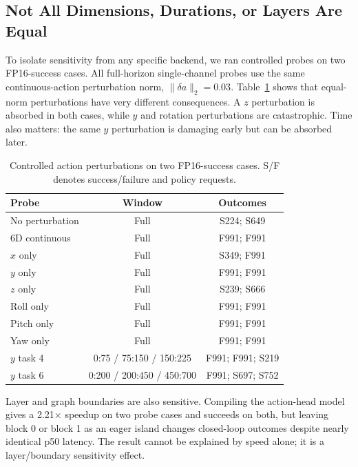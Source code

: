 \documentclass[letterpaper,10pt,twocolumn]{article}
\begin{document}
\subsection{Not All Dimensions, Durations, or Layers Are Equal}

To isolate sensitivity from any specific backend, we ran controlled probes on two FP16-success cases. All full-horizon single-channel probes use the same continuous-action perturbation norm, $\|\delta a\|_2=0.03$. Table~\ref{tab:icra-anisotropy} shows that equal-norm perturbations have very different consequences. A $z$ perturbation is absorbed in both cases, while $y$ and rotation perturbations are catastrophic. Time also matters: the same $y$ perturbation is damaging early but can be absorbed later.

\begin{table}[H]
\centering
\caption{Controlled action perturbations on two FP16-success cases. S/F denotes success/failure and policy requests.}
\label{tab:icra-anisotropy}
\scriptsize
\setlength{\tabcolsep}{2.5pt}
\begin{tabular}{lcc}
\toprule
Probe & Window & Outcomes \\
\midrule
No perturbation & Full & S224; S649 \\
6D continuous & Full & F991; F991 \\
$x$ only & Full & S349; F991 \\
$y$ only & Full & F991; F991 \\
$z$ only & Full & S239; S666 \\
Roll only & Full & F991; F991 \\
Pitch only & Full & F991; F991 \\
Yaw only & Full & F991; F991 \\
$y$ task 4 & 0:75 / 75:150 / 150:225 & F991; F991; S219 \\
$y$ task 6 & 0:200 / 200:450 / 450:700 & F991; S697; S752 \\
\bottomrule
\end{tabular}
\end{table}

Layer and graph boundaries are also sensitive. Compiling the action-head model gives a 2.21$\times$ speedup on two probe cases and succeeds on both, but leaving block 0 or block 1 as an eager island changes closed-loop outcomes despite nearly identical p50 latency. The result cannot be explained by speed alone; it is a layer/boundary sensitivity effect.
\end{document}

